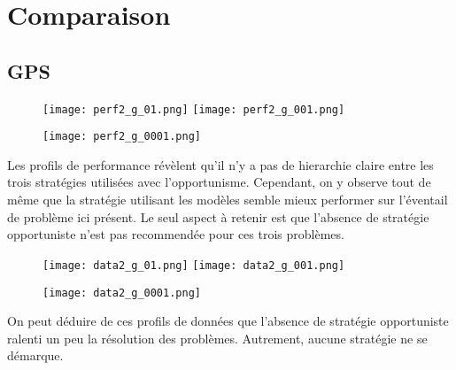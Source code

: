 \documentclass[letterpaper]{scrartcl}
\begin{document}
\section{Comparaison}
\subsection{GPS}

	\begin{figure}[h]
	\texttt{[image: perf2\_g\_01.png]}
	\texttt{[image: perf2\_g\_001.png]}
	\end{figure}
	\begin{figure}[h]
		\texttt{[image: perf2\_g\_0001.png]}
		\centering
	\end{figure}
\FloatBarrier
Les profils de performance révèlent qu'il n'y a pas de hierarchie claire entre les trois stratégies utilisées avec l'opportunisme. Cependant, on y observe tout de même que la stratégie utilisant les modèles semble mieux performer sur l'éventail de problème ici présent. Le seul aspect à retenir est que l'absence de stratégie opportuniste n'est pas recommendée pour ces trois problèmes. 
	\begin{figure}[h]
	\texttt{[image: data2\_g\_01.png]}
	\texttt{[image: data2\_g\_001.png]}\\
	\end{figure}
	\begin{figure}[h]
		\texttt{[image: data2\_g\_0001.png]}
		\centering
	\end{figure}
\FloatBarrier
	On peut déduire de ces profils de données que l'absence de stratégie opportuniste ralenti un peu la résolution des problèmes. Autrement, aucune stratégie ne se démarque.
	\newpage
\end{document}
